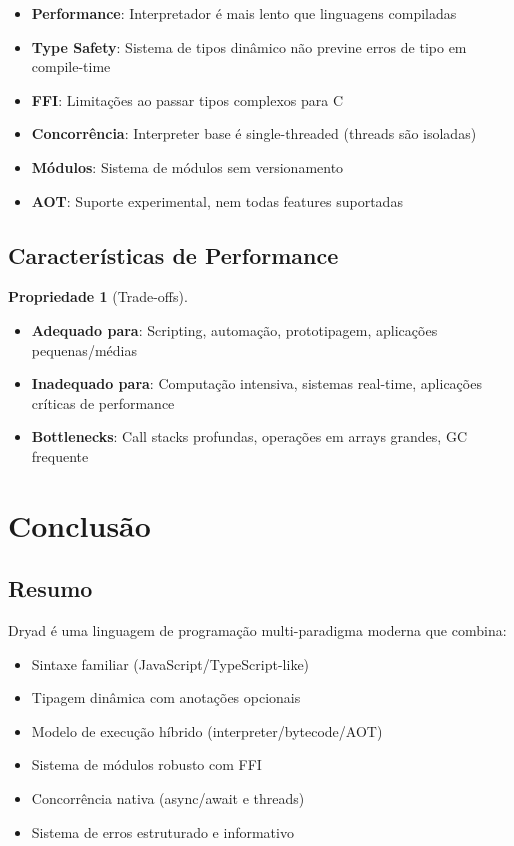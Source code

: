 \documentclass[12pt,a4paper]{article}
\theoremstyle{definition}
\newtheorem{property}{Propriedade}[section]
\begin{document}
\begin{itemize}
    \item \textbf{Performance}: Interpretador é mais lento que linguagens compiladas
    \item \textbf{Type Safety}: Sistema de tipos dinâmico não previne erros de tipo em compile-time
    \item \textbf{FFI}: Limitações ao passar tipos complexos para C
    \item \textbf{Concorrência}: Interpreter base é single-threaded (threads são isoladas)
    \item \textbf{Módulos}: Sistema de módulos sem versionamento
    \item \textbf{AOT}: Suporte experimental, nem todas features suportadas
\end{itemize}

\subsection{Características de Performance}

\begin{property}[Trade-offs]
\begin{itemize}
    \item \textbf{Adequado para}: Scripting, automação, prototipagem, aplicações pequenas/médias
    \item \textbf{Inadequado para}: Computação intensiva, sistemas real-time, aplicações críticas de performance
    \item \textbf{Bottlenecks}: Call stacks profundas, operações em arrays grandes, GC frequente
\end{itemize}
\end{property}

\section{Conclusão}

\subsection{Resumo}

Dryad é uma linguagem de programação multi-paradigma moderna que combina:
\begin{itemize}
    \item Sintaxe familiar (JavaScript/TypeScript-like)
    \item Tipagem dinâmica com anotações opcionais
    \item Modelo de execução híbrido (interpreter/bytecode/AOT)
    \item Sistema de módulos robusto com FFI
    \item Concorrência nativa (async/await e threads)
    \item Sistema de erros estruturado e informativo
\end{itemize}
\end{document}
